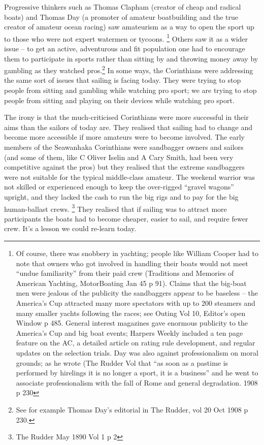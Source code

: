 \documentclass[
  letterpaper,
]{scrbook}
\begin{document}
Progressive thinkers such as Thomas Clapham (creator of cheap and
radical boats) and Thomas Day (a promoter of amateur boatbuilding and
the true creator of amateur ocean racing) saw amateurism as a way to
open the sport up to those who were not expert watermen or tycoons.
\footnote{Of course, there was snobbery in yachting; people like William
  Cooper had to note that owners who got involved in handling their
  boats would not meet ``undue familiarity'' from their paid crew
  (Traditions and Memories of American Yachting, MotorBoating Jan 45 p
  91). Claims that the big-boat men were jealous of the publicity the
  sandbaggers appear to be baseless -- the America's Cup attracted many
  more spectators with up to 200 steamers and many smaller yachts
  following the races; see Outing Vol 10, Editor's open Window p 485.
  General interest magazines gave enormous publicity to the America's
  Cup and big boat events; Harpers Weekly included a ten page feature on
  the AC, a detailed article on rating rule development, and regular
  updates on the selection trials. Day was also against professionalism
  on moral grounds; as he wrote (The Rudder Vol that ``as soon as a
  pastime is performed by hirelings it is no longer a sport, it is a
  business'' and he went to associate professionalism with the fall of
  Rome and general degradation. 1908 p 230} Others saw it as a wider
issue -- to get an active, adventurous and fit population one had to
encourage them to participate in sports rather than sitting by and
throwing money away by gambling as they watched pros.\footnote{See for
  example Thomas Day's editorial in The Rudder, vol 20 Oct 1908 p 230.}
In some ways, the Corinthians were addressing the same sort of issues
that sailing is facing today. They were trying to stop people from
sitting and gambling while watching pro sport; we are trying to stop
people from sitting and playing on their devices while watching pro
sport.

The irony is that the much-criticised Corinthians were more successful
in their aims than the sailors of today are. They realised that sailing
had to change and become more accessible if more amateurs were to become
involved. The early members of the Seawanhaka Corinthians were
sandbagger owners and sailors (and some of them, like C Oliver Iselin
and A Cary Smith, had been very competitive against the pros) but they
realised that the extreme sandbaggers were not suitable for the typical
middle-class amateur. The weekend warrior was not skilled or experienced
enough to keep the over-rigged ``gravel wagons'' upright, and they
lacked the cash to run the big rigs and to pay for the big human-ballast
crews. \footnote{The Rudder May 1890 Vol 1 p 2} They realised that if
sailing was to attract more participants the boats had to become
cheaper, easier to sail, and require fewer crew. It's a lesson we could
re-learn today.
\end{document}
